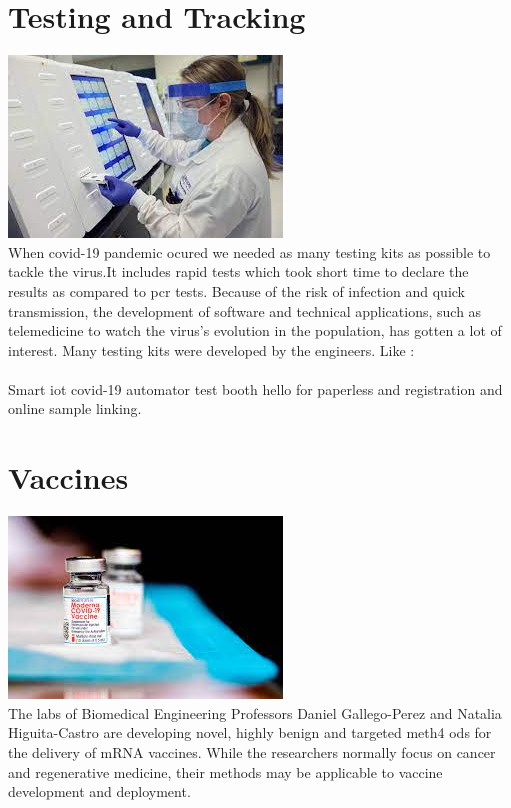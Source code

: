 \documentclass[12pt]{article}
\begin{document}
\section{Testing and Tracking}
\includegraphics[scale=0.65]{tt.jpeg} 
\\
When covid-19 pandemic ocured we needed as many testing kits as
possible to tackle the virus.It includes rapid tests which took short time
to declare the results as compared to pcr tests.
Because of the risk of infection and quick transmission, the development
of software and technical applications, such as telemedicine to watch the
virus’s evolution in the population, has gotten a lot of interest.
Many testing kits were developed by the engineers.
Like :
\\
\\
Smart iot covid-19 automator test booth hello for paperless and registration and online sample linking.
\section{Vaccines}
\includegraphics[scale=0.65]{vcn.jpeg}
\\
The labs of Biomedical Engineering Professors Daniel Gallego-Perez and Natalia Higuita-Castro are developing novel, highly benign and targeted meth4
ods for the delivery of mRNA vaccines. While the researchers normally focus
on cancer and regenerative medicine, their methods may be applicable to
vaccine development and deployment.
\end{document}
